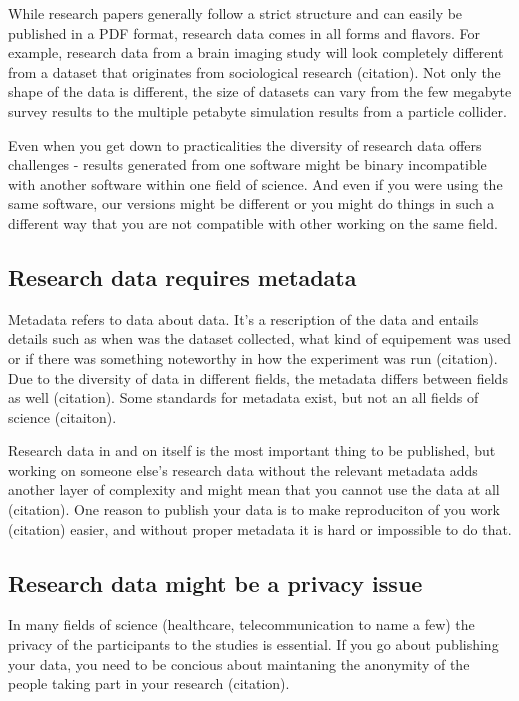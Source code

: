 While research papers generally follow a
strict structure and can easily be published in a PDF format, research data
comes in all forms and flavors. For example, research data from a brain imaging
study will look completely different from a dataset that originates from
sociological research (citation). Not only the shape of the data is different,
the size of datasets can vary from the few megabyte survey results to the
multiple petabyte simulation results from a particle collider.

Even when you get down to practicalities the diversity of research data offers
challenges - results generated from one software might be binary incompatible
with another software within one field of science. And even if you were using
the same software, our versions might be different or you might do things in
such a different way that you are not compatible with other working on the
same field.

\subsection{Research data requires metadata}

Metadata refers to data about data. It's a rescription of the data and entails
details such as when was the dataset collected, what kind of equipement was
used or if there was something noteworthy in how the experiment was run
(citation). Due to the diversity of data in different fields, the metadata
differs between fields as well (citation). Some standards for metadata exist,
but not an all fields of science (citaiton).

Research data in and on itself is the most important thing to be published, but
working on someone else's research data without the relevant metadata adds
another layer of complexity and might mean that you cannot use the data at all
(citation). One reason to publish your data is to make reproduciton of you work
(citation) easier, and without proper metadata it is hard or impossible to
do that.

\subsection{Research data might be a privacy issue}

In many fields of science (healthcare, telecommunication to name a few) the
privacy of the participants to the studies is essential. If you go about
publishing your data, you need to be concious about maintaning the anonymity
of the people taking part in your research (citation).

